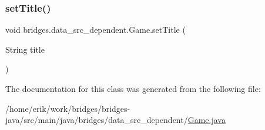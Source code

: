 \mbox{\label{classbridges_1_1data__src__dependent_1_1_game_a0c87151b75bc10357aa6829ebfc0cae3}} 
\subsubsection{\texorpdfstring{set\+Title()}{setTitle()}}
{\footnotesize\ttfamily void bridges.\+data\+\_\+src\+\_\+dependent.\+Game.\+set\+Title (\begin{DoxyParamCaption}\item[{String}]{title }\end{DoxyParamCaption})}



The documentation for this class was generated from the following file\+:\begin{DoxyCompactItemize}
\item 
/home/erik/work/bridges/bridges-\/java/src/main/java/bridges/data\+\_\+src\+\_\+dependent/\hyperlink{_game_8java}{Game.\+java}\end{DoxyCompactItemize}
